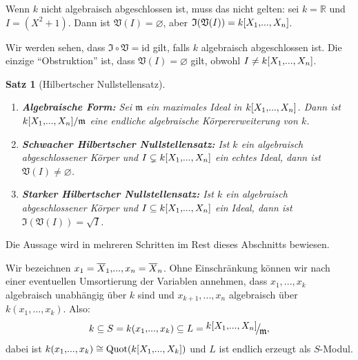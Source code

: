 \documentclass[a4paper,12pt]{scrbook}
\theoremstyle{keinenummern} %
\theoremstyle{mitnummern}
\newtheorem{satz}{Satz}
\theoremstyle{unserbeweis}
\def\V{\mathfrak{V}}
\def\I{\mathfrak{I}}
\def\m{\mathfrak{m}}
\newcommand{\id}{\mathrm{id}}
\newcommand{\leer}{\ensuremath{\varnothing}}
\newcommand{\Quot}{\operatorname{Quot}}
\renewcommand{\dotsc}{\ensuremath{\!...}}
\newcommand{\set}[1]{\ensuremath{\mathbb{#1}}}
\newcommand{\R}{\set{R}}
\def\Bar#1{\ensuremath\overline{#1}}
\newcommand{\Quotient}[2]{
  \mathchoice
  { %
    \raisebox{0.7ex}{\ensuremath{#1}}
    \ensuremath{\mkern-3mu}\big/\ensuremath{\mkern-3mu}
    \raisebox{-0.6ex}{\ensuremath{#2}}
  }
  { %
    #1/#2
  }
  { %
    #1/#2
  }
  { %
    #1/#2
  }
}
\newcommand{\polyx}[1][n]{\ensuremath%
  [X_{1},\dotsc,X_{#1}]}
\begin{document}
\begin{nbsp}
  Wenn $k$ nicht algebraisch abgeschlossen ist, muss das nicht gelten: sei $k=\R$ und $I=(X^2+1)$. Dann ist $\V(I)=\leer$, aber
  $\I(\V(I)) = k\polyx$.
\end{nbsp}

Wir werden sehen, dass $\I\circ\V=\id$ gilt, falls $k$ algebraisch abgeschlossen ist. Die einzige \enquote{Obstruktion} ist,
dass $\V(I)=\leer$ gilt, obwohl $I\neq k\polyx$.

\begin{satz}[Hilbertscher Nullstellensatz]\label{satz2}\label{HNS}
  \begin{enumerate}
  \item{} {\bf Algebraische Form:} Sei $\m$ ein maximales Ideal in \relax $k\polyx$. Dann ist
    $\Quotient{k\polyx}{\m}$ eine endliche algebraische Körpererweiterung von $k$.
  \item {\bf Schwacher Hilbertscher Nullstellensatz:} Ist $k$ ein algebraisch abgeschlossener Körper und
    $I\subsetneq k\polyx$ ein echtes Ideal, dann ist $\V(I)\neq\leer$.
  \item {\bf Starker Hilbertscher Nullstellensatz:} Ist $k$ ein algebraisch abgeschlossener Körper und $I\subseteq
    k\polyx$ ein Ideal, dann ist $\I(\V(I))=\sqrt{I}$.
  \end{enumerate}
\end{satz}

Die Aussage wird in mehreren Schritten im Rest dieses Abschnitts bewiesen.

Wir bezeichnen $x_1=\Bar{X}_1,\dotsc,x_n=\Bar{X}_n$. Ohne Einschränkung können wir nach einer eventuellen Umsortierung
der Variablen annehmen, dass $x_1,\dotsc,x_k$ algebraisch unabhängig über $k$ sind und $x_{k+1},\dotsc,x_n$ algebraisch über
$k(x_1,\dotsc,x_k)$. Also:
\[ k \subseteq S = k(x_1,\dotsc,x_k) \subseteq L=\Quotient{k\polyx}{\m}, \]
dabei ist $k(x_1,\dotsc,x_k)\cong\Quot(k\polyx[k])$ und $L$ ist endlich erzeugt als $S$-Modul.
\end{document}
